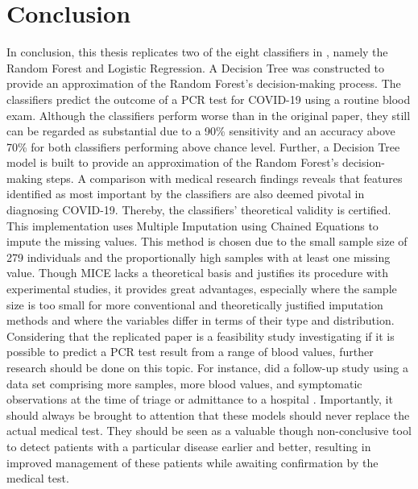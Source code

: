 \section{Conclusion}
In conclusion, this thesis replicates two of the eight classifiers in 
\cite{RN127}, namely the Random Forest and Logistic Regression. A Decision Tree 
was constructed to provide an approximation of the Random Forest's 
decision-making process. The classifiers predict the outcome of a PCR test for 
COVID-19 using a routine blood exam. Although the classifiers perform worse 
than in the 
original paper, they still can be regarded as substantial due to a 90\% 
sensitivity and an accuracy above 70\% for both classifiers performing above 
chance level.
Further, a Decision Tree model is built to provide an approximation of the 
Random Forest's decision-making steps.
A comparison with medical research findings reveals that features 
identified as most important by the classifiers are also deemed pivotal in 
diagnosing COVID-19. Thereby, the classifiers' theoretical
validity is certified.
This implementation uses Multiple Imputation using Chained Equations to impute 
the missing values. This method is chosen due to the small sample size of 279 
individuals and the proportionally high samples with at least one 
missing value. Though MICE lacks a theoretical basis and justifies its 
procedure with experimental studies, it provides great advantages, especially 
where the sample size is too small for more conventional and theoretically 
justified imputation methods and where the variables differ in terms of their 
type and distribution.
Considering that the replicated paper is a feasibility study investigating if 
it is 
possible to predict a PCR test result from a range of blood values, further 
research should be done on this topic. For instance, \citeauthor{RN127} did a 
follow-up study using a data set comprising more samples, more blood values, 
and symptomatic observations at the time of triage or admittance to a hospital 
\cite{RN179}.
Importantly, it should always be brought to attention that these 
models should never replace the actual medical test. They should be seen as a 
valuable though non-conclusive tool to detect patients with a particular 
disease earlier and better, resulting in improved management of these patients 
while awaiting confirmation by the medical test.
